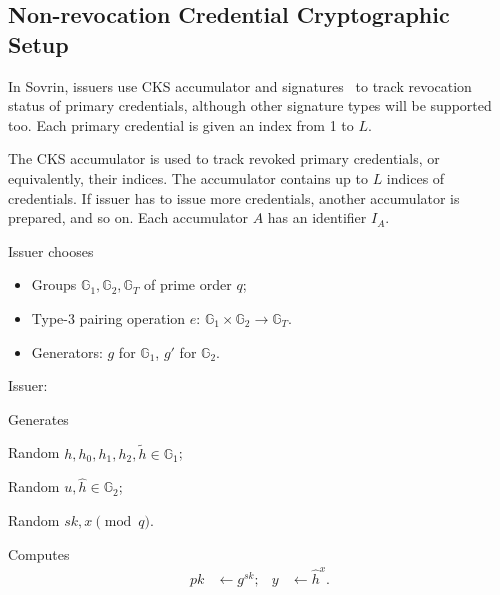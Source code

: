 \documentclass[a4paper]{article}
\begin{document}
\subsection{Non-revocation Credential Cryptographic Setup}
In Sovrin, issuers use CKS accumulator and signatures~\cite{CamenischKS09} to track revocation status of primary credentials, although other signature types will be supported too. Each primary credential is given an index from 1 to $L$.

The CKS  accumulator is used to track revoked primary credentials, or equivalently, their indices. The accumulator contains up to $L$ indices of credentials. If issuer has to issue more credentials, another accumulator is prepared, and so on. Each accumulator $A$ has an identifier $I_A$.

Issuer chooses
\begin{itemize}
    \item Groups $\mathbb{G}_1,\mathbb{G}_2,\mathbb{G}_T$ of
    prime order $q$;
    \item Type-3 pairing operation $e:\, \mathbb{G}_1\times\mathbb{G}_2\rightarrow\mathbb{G}_T$.
    \item Generators: $g$ for $\mathbb{G}_1$, $g'$ for
    $\mathbb{G}_2$.
\end{itemize}

Issuer:
\begin{legal}
    \item Generates
    \begin{legal}
        \item Random $h,h_0,h_1,h_2,\widetilde{h}\in \mathbb{G}_1$;
        \item Random $u,\widehat{h}\in \mathbb{G}_2$;
        \item Random $sk,x \pmod{q}$.
    \end{legal}
    \item Computes
\begin{align*}
    pk&\leftarrow g^{sk}; & y&\leftarrow \widehat{h}^x.
\end{align*}
\end{legal}
\end{document}
